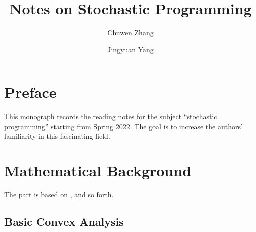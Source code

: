 \documentclass{beamerswitch}
\title{Notes on Stochastic Programming}
\begin{document}
\author[1]{\small Chuwen Zhang}
\author[1]{\small Jingyuan Yang}

\maketitle
\section{Preface}

This monograph records the reading notes for the subject ``stochastic programming'' starting from Spring 2022. The goal is to increase the authors' familiarity in this fascinating field.
\section{Mathematical Background}
The part is based on \cite{shapiro_lectures_2014}, \cite{birge_introduction_2011} and so forth.
\subsection{Basic Convex Analysis}
\end{document}
